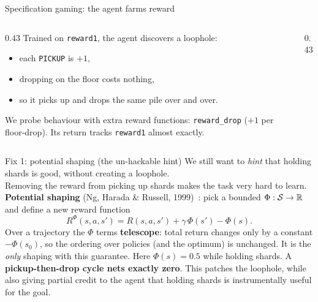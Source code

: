 \begin{frame}{Specification gaming: the agent farms reward}
\begin{columns}
\begin{column}{0.43\textwidth}
Trained on \texttt{reward1}, the agent discovers a loophole:
\begin{itemize}
  \item each \texttt{PICKUP} is $+1$,
  \item dropping on the floor costs nothing,
  \item so it picks up and drops the same pile over and over.
\end{itemize}
\pause
We probe behaviour with extra reward functions: \texttt{reward\_drop} ($+1$ per floor-drop). Its return tracks \texttt{reward1} almost exactly.
\end{column}
\begin{column}{0.43\textwidth}
\centering
{}
\end{column}
\end{columns}
\end{frame}

\begin{frame}{Fix 1: potential shaping (the un-hackable hint)}
We still want to \emph{hint} that holding shards is good, without creating a loophole. \\
Removing the reward from picking up shards makes the task very hard to learn.
\vfill
\textbf{Potential shaping} (Ng, Harada \& Russell, 1999)~: pick a bounded $\Phi: \mathcal{S} \to \mathbb{R}$ and define a new reward function
\[
  R^\Phi(s,a,s') = R(s,a,s') + \gamma\,\Phi(s') - \Phi(s).
\]
\pause
Over a trajectory the $\Phi$ terms \textbf{telescope}: total return changes only by a constant $-\Phi(s_0)$, so the ordering over policies (and the optimum) is unchanged. It is the \emph{only} shaping with this guarantee.
\pause
\vfill
Here $\Phi(s) = 0.5$ while holding shards. A \textbf{pickup-then-drop cycle nets exactly zero}.
This patches the loophole, while also giving partial credit to the agent that holding shards is
instrumentally useful for the goal.
\end{frame}


